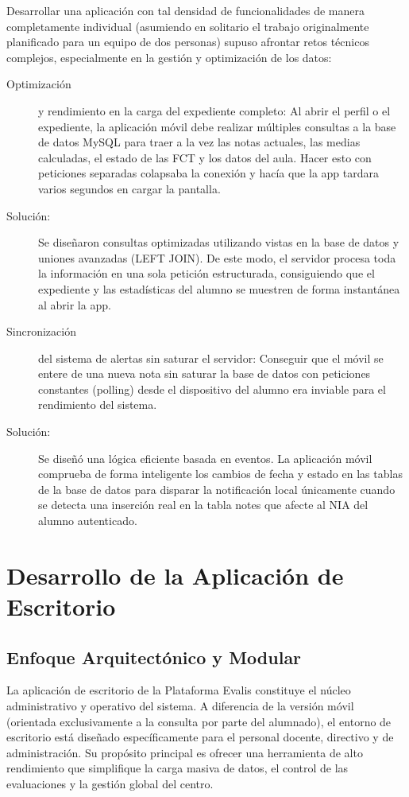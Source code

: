 \documentclass[spanish]{report}
\begin{document}
Desarrollar una aplicación con tal densidad de funcionalidades de
manera completamente individual (asumiendo en solitario el trabajo
originalmente planificado para un equipo de dos personas) supuso afrontar
retos técnicos complejos, especialmente en la gestión y optimización
de los datos:
\begin{description}
\item [{Optimización}] y rendimiento en la carga del expediente completo:
Al abrir el perfil o el expediente, la aplicación móvil debe realizar
múltiples consultas a la base de datos MySQL para traer a la vez las
notas actuales, las medias calculadas, el estado de las FCT y los
datos del aula. Hacer esto con peticiones separadas colapsaba la conexión
y hacía que la app tardara varios segundos en cargar la pantalla.
\item [{Solución:}] Se diseñaron consultas optimizadas utilizando vistas
en la base de datos y uniones avanzadas (LEFT JOIN). De este modo,
el servidor procesa toda la información en una sola petición estructurada,
consiguiendo que el expediente y las estadísticas del alumno se muestren
de forma instantánea al abrir la app.
\item [{Sincronización}] del sistema de alertas sin saturar el servidor:
Conseguir que el móvil se entere de una nueva nota sin saturar la
base de datos con peticiones constantes (polling) desde el dispositivo
del alumno era inviable para el rendimiento del sistema.
\item [{Solución:}] Se diseñó una lógica eficiente basada en eventos. La
aplicación móvil comprueba de forma inteligente los cambios de fecha
y estado en las tablas de la base de datos para disparar la notificación
local únicamente cuando se detecta una inserción real en la tabla
notes que afecte al NIA del alumno autenticado.
\end{description}

\chapter*{Desarrollo de la Aplicación de Escritorio}

\section{Enfoque Arquitectónico y Modular}

La aplicación de escritorio de la Plataforma Evalis constituye el
núcleo administrativo y operativo del sistema. A diferencia de la
versión móvil (orientada exclusivamente a la consulta por parte del
alumnado), el entorno de escritorio está diseñado específicamente
para el personal docente, directivo y de administración. Su propósito
principal es ofrecer una herramienta de alto rendimiento que simplifique
la carga masiva de datos, el control de las evaluaciones y la gestión
global del centro.
\end{document}
